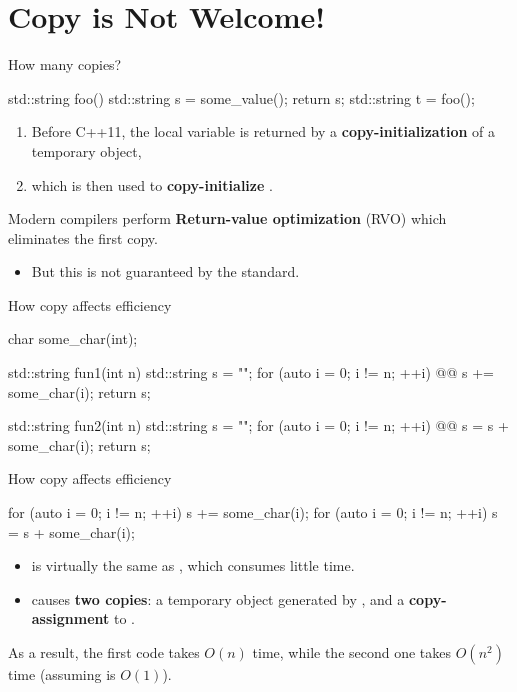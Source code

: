 
\section{Copy is Not Welcome!}

\begin{frame}[fragile]{How many copies?}
  \begin{cpp}
std::string foo() {
  std::string s = some_value();
  return s;
}
std::string t = foo();
  \end{cpp}
  \pause
  \begin{enumerate}
    \item Before C++11, the local variable  is returned by a \textbf{copy-initialization} of a temporary object,
    \item which is then used to \textbf{copy-initialize} .
    \pause
  \end{enumerate}
  Modern compilers perform \textbf{Return-value optimization} (RVO) which eliminates the first copy.
  \begin{itemize}
    \item But this is not guaranteed by the standard.
  \end{itemize}
\end{frame}

\begin{frame}[fragile]{How copy affects efficiency}
  \begin{cpp}
char some_char(int);

std::string fun1(int n) {
  std::string s = "";
  for (auto i = 0; i != n; ++i)
@\pinkbox @    s += some_char(i);
  return s;
}

std::string fun2(int n) {
  std::string s = "";
  for (auto i = 0; i != n; ++i)
@\pinkbox @    s = s + some_char(i);
  return s;
}
  \end{cpp}
\end{frame}

\begin{frame}[fragile]{How copy affects efficiency}
  \begin{cpp}
for (auto i = 0; i != n; ++i)
  s += some_char(i);
for (auto i = 0; i != n; ++i)
  s = s + some_char(i);
  \end{cpp}
  \begin{itemize}
    \item {} is virtually the same as , which consumes little time.
    \item {} causes \textbf{two copies}: a temporary object generated by , and a \textbf{copy-assignment} to .
  \end{itemize}
  \pause
  As a result, the first code takes \(O(n)\) time, while the second one takes \(O\left(n^2\right)\) time (assuming  is \(O(1)\)).
\end{frame}

